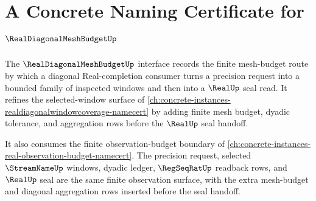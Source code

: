 \chapter{A Concrete Naming Certificate for $\RealDiagonalMeshBudgetUp$}
\label{ch:concrete-instances-realdiagonalmeshbudget-namecert}

The $\RealDiagonalMeshBudgetUp$ interface records the finite mesh-budget route by which a diagonal Real-completion consumer turns a precision request into a bounded family of inspected windows and then into a $\RealUp$ seal read. It refines the selected-window surface of \autoref{ch:concrete-instances-realdiagonalwindowcoverage-namecert} by adding finite mesh budget, dyadic tolerance, and aggregation rows before the $\RealUp$ seal handoff.

It also consumes the finite observation-budget boundary of \autoref{ch:concrete-instances-real-observation-budget-namecert}. The precision request, selected $\StreamNameUp$ windows, dyadic ledger, $\RegSeqRatUp$ readback rows, and $\RealUp$ seal are the same finite observation surface, with the extra mesh-budget and diagonal aggregation rows inserted before the seal handoff.

